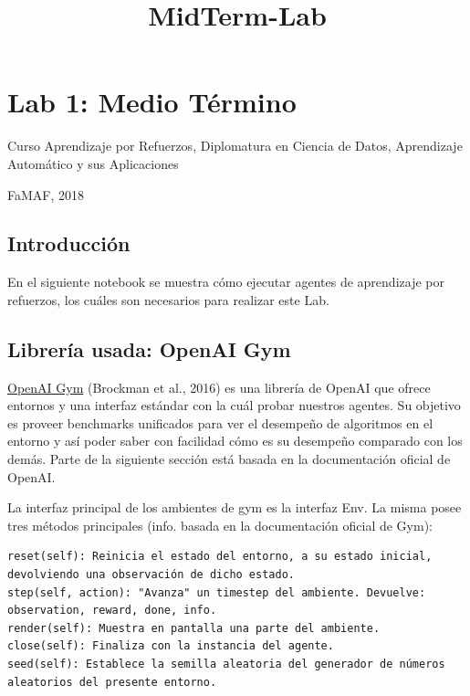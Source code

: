 \documentclass[11pt]{article}
\title{MidTerm-Lab}
\begin{document}
    
    
    \maketitle
    
    

    
    \section{Lab 1: Medio Término}\label{lab-1-medio-tuxe9rmino}

Curso Aprendizaje por Refuerzos, Diplomatura en Ciencia de Datos,
Aprendizaje Automático y sus Aplicaciones

FaMAF, 2018

    \subsection{Introducción}\label{introducciuxf3n}

En el siguiente notebook se muestra cómo ejecutar agentes de aprendizaje
por refuerzos, los cuáles son necesarios para realizar este Lab.

    \subsection{Librería usada: OpenAI
Gym}\label{libreruxeda-usada-openai-gym}

\href{https://gym.openai.com/}{OpenAI Gym} (Brockman et al., 2016) es
una librería de OpenAI que ofrece entornos y una interfaz estándar con
la cuál probar nuestros agentes. Su objetivo es proveer benchmarks
unificados para ver el desempeño de algoritmos en el entorno y así poder
saber con facilidad cómo es su desempeño comparado con los demás. Parte
de la siguiente sección está basada en la documentación oficial de
OpenAI.

    La interfaz principal de los ambientes de gym es la interfaz Env. La
misma posee tres métodos principales (info. basada en la documentación
oficial de Gym):

\begin{verbatim}
reset(self): Reinicia el estado del entorno, a su estado inicial, devolviendo una observación de dicho estado.
step(self, action): "Avanza" un timestep del ambiente. Devuelve: observation, reward, done, info.
render(self): Muestra en pantalla una parte del ambiente.
close(self): Finaliza con la instancia del agente.
seed(self): Establece la semilla aleatoria del generador de números aleatorios del presente entorno.
\end{verbatim}
\end{document}
